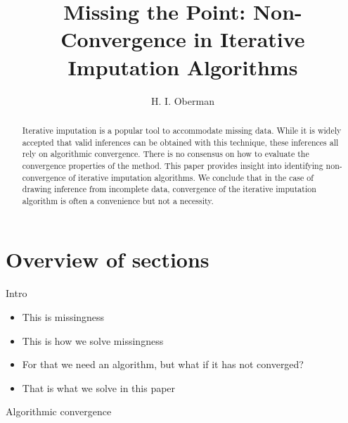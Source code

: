 \documentclass[Royal,times,sageh]{sagej}
\begin{document}
\title{Missing the Point: Non-Convergence in Iterative Imputation Algorithms}


\author{H. I. Oberman}




\begin{abstract}
Iterative imputation is a popular tool to accommodate missing data. While it is widely accepted that valid inferences can be obtained with this technique, these inferences all rely on algorithmic convergence. There is no consensus on how to evaluate the convergence properties of the method. This paper provides insight into identifying non-convergence of iterative imputation algorithms. We conclude that in the case of drawing inference from incomplete data, convergence of the iterative imputation algorithm is often a convenience but not a necessity.
\end{abstract}


\maketitle

\hypertarget{overview-of-sections}{%
\section{Overview of sections}\label{overview-of-sections}}

Intro

\begin{itemize}
\item
  This is missingness
\item
  This is how we solve missingness
\item
  For that we need an algorithm, but what if it has not converged?
\item
  That is what we solve in this paper
\end{itemize}

Algorithmic convergence
\end{document}
